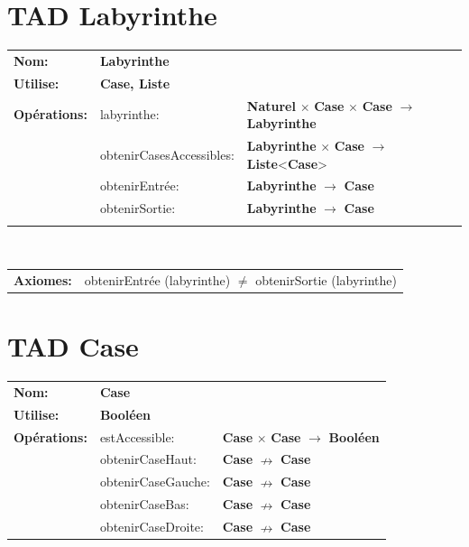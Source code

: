 \documentclass[a4paper,11pt]{article}
\begin{document}
%
%
\fontsize{14pt}{18pt}
\selectfont



\section*{TAD Labyrinthe}

\noindent\begin{tabular}{lll}
    \textbf{Nom:} & \textbf{Labyrinthe} & \\
    \textbf{Utilise:} & \textbf{Case, Liste} & \\
    \textbf{Opérations:} & labyrinthe: & \textbf{Naturel} $\times$ \textbf{Case} $\times$ \textbf{Case} $\to$ \textbf{Labyrinthe}\\
     & obtenirCasesAccessibles: & \textbf{Labyrinthe} $\times$ \textbf{Case} $\to$ \textbf{Liste}<\textbf{Case}>\\
     & obtenirEntrée: & \textbf{Labyrinthe} $\to$ \textbf{Case}\\
     & obtenirSortie: & \textbf{Labyrinthe} $\to$ \textbf{Case}\\
     & & \\
    \end{tabular}\\
\begin{tabular}{ll}
    \textbf{Axiomes:} & obtenirEntrée (labyrinthe) $\neq$ obtenirSortie (labyrinthe)
\end{tabular}

\section*{TAD Case}

\noindent
\begin{tabular}{lll}
    \textbf{Nom:} & \textbf{Case} & \\
    \textbf{Utilise:} & \textbf{Booléen} & \\
    \textbf{Opérations:} & estAccessible: & \textbf{Case} $\times$ \textbf{Case} $\to$ \textbf{Booléen}\\
     & obtenirCaseHaut: & \textbf{Case} $\nrightarrow$ \textbf{Case}\\
     & obtenirCaseGauche: & \textbf{Case} $\nrightarrow$ \textbf{Case}\\
     & obtenirCaseBas: & \textbf{Case} $\nrightarrow$ \textbf{Case}\\
     & obtenirCaseDroite: & \textbf{Case} $\nrightarrow$ \textbf{Case}\\
\end{tabular}
\end{document}
